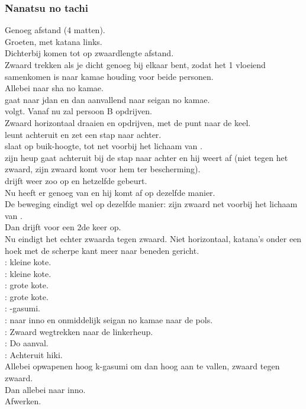 \subsubsection{Nanatsu no tachi}

Genoeg afstand (4 matten).\\
Groeten, met katana links.\\
Dichterbij komen tot op zwaardlengte afstand.\\
Zwaard trekken als je dicht genoeg bij elkaar bent, zodat het 1 vloeiend samenkomen is naar kamae houding voor beide personen.\\
Allebei naar sha no kamae.\\
\pA gaat naar jdan en dan aanvallend naar seigan no kamae.\\
\pB volgt. Vanaf nu zal persoon B opdrijven.\\
Zwaard horizontaal draaien en opdrijven, met de punt naar de keel.\\
\pA leunt achteruit en zet een stap naar achter.\\
\pB slaat op buik-hoogte, tot net voorbij het lichaam van \pa.\\
\pA zijn heup gaat achteruit bij de stap naar achter en hij weert af (niet tegen het zwaard, zijn zwaard komt voor hem ter bescherming).\\
\pB drijft weer zoo op en hetzelfde gebeurt.\\
Nu heeft \pa er genoeg van en hij komt af op dezelfde manier.\\
De beweging eindigt wel op dezelfde manier: \pb zijn zwaard net voorbij het lichaam van \pa.\\
Dan drijft \pa voor een 2de keer op.\\
Nu eindigt het echter zwaarda tegen zwaard. Niet horizontaal, katana's onder een hoek met de scherpe kant meer naar beneden gericht.\\
\pA: kleine kote.\\
\pB: kleine kote.\\
\pA: grote kote.\\
\pB: grote kote.\\
\pA: -gasumi.\\
\pB: naar inno en onmiddelijk seigan no kamae naar de pols.\\
\pA: Zwaard wegtrekken naar de linkerheup.\\
\pB: Do aanval.\\
\pA: Achteruit hiki.\\
Allebei opwapenen hoog k-gasumi om dan hoog aan te vallen, zwaard tegen zwaard.\\
Dan allebei naar inno.\\
Afwerken.


